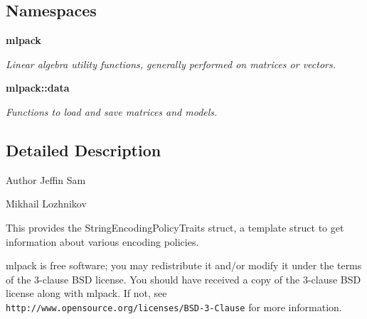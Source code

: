 \subsection*{Namespaces}
\begin{DoxyCompactItemize}
\item 
 \textbf{ mlpack}
\begin{DoxyCompactList}\small\item\em Linear algebra utility functions, generally performed on matrices or vectors. \end{DoxyCompactList}\item 
 \textbf{ mlpack\+::data}
\begin{DoxyCompactList}\small\item\em Functions to load and save matrices and models. \end{DoxyCompactList}\end{DoxyCompactItemize}


\subsection{Detailed Description}
\begin{DoxyAuthor}{Author}
Jeffin Sam 

Mikhail Lozhnikov
\end{DoxyAuthor}
This provides the String\+Encoding\+Policy\+Traits struct, a template struct to get information about various encoding policies.

mlpack is free software; you may redistribute it and/or modify it under the terms of the 3-\/clause B\+SD license. You should have received a copy of the 3-\/clause B\+SD license along with mlpack. If not, see {\tt http\+://www.\+opensource.\+org/licenses/\+B\+S\+D-\/3-\/\+Clause} for more information. 